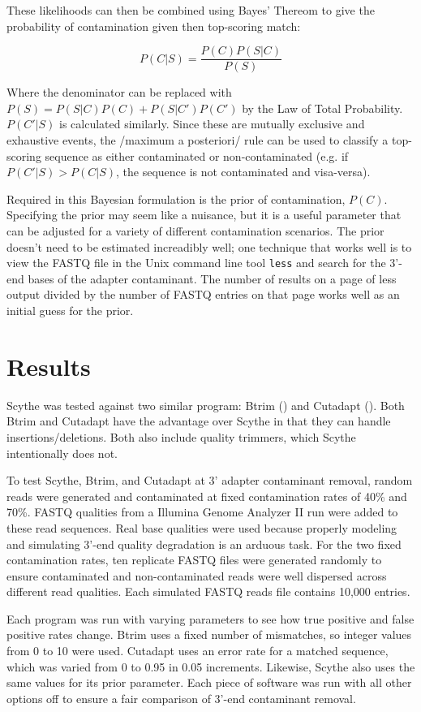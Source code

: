 \documentclass{bioinfo}
\begin{document}
\begin{methods}
These likelihoods can then be combined using Bayes' Thereom to give
the probability of contamination given then top-scoring match:

$$ P(C|S) = \frac{P(C) P(S|C)}{P(S)} $$

Where the denominator can be replaced with $P(S) = P(S | C)P(C) +
P(S | C') P(C')$ by the Law of Total Probability. $P(C'|S)$ is
calculated similarly. Since these are mutually exclusive and
exhaustive events, the /maximum a posteriori/ rule can be used to
classify a top-scoring sequence as either contaminated or
non-contaminated (e.g. if $P(C'|S) > P(C|S)$, the sequence is not
contaminated and visa-versa).

Required in this Bayesian formulation is the prior of contamination,
$P(C)$. Specifying the prior may seem like a nuisance, but it is a
useful parameter that can be adjusted for a variety of different
contamination scenarios. The prior doesn't need to be estimated
increadibly well; one technique that works well is to view the FASTQ
file in the Unix command line tool \texttt{less} and search for the
3'-end bases of the adapter contaminant. The number of results on a
page of less output divided by the number of FASTQ entries on that
page works well as an initial guess for the prior.


\section{Results}
Scythe was tested against two similar program: Btrim
(\citealp{pmid21651976}) and Cutadapt (\citealp{pmid19737799}). Both
Btrim and Cutadapt have the advantage over Scythe in that they can
handle insertions/deletions. Both also include quality trimmers, which
Scythe intentionally does not.

To test Scythe, Btrim, and Cutadapt at 3' adapter contaminant removal,
random reads were generated and contaminated at fixed contamination
rates of 40\% and 70\%. FASTQ qualities from a Illumina Genome
Analyzer II run were added to these read sequences. Real base
qualities were used because properly modeling and simulating 3'-end
quality degradation is an arduous task. For the two fixed
contamination rates, ten replicate FASTQ files were generated randomly
to ensure contaminated and non-contaminated reads were well dispersed
across different read qualities. Each simulated FASTQ reads file
contains 10,000 entries.

Each program was run with varying parameters to see how true positive
and false positive rates change. Btrim uses a fixed number of
mismatches, so integer values from 0 to 10 were used. Cutadapt uses an
error rate for a matched sequence, which was varied from 0 to 0.95 in
0.05 increments. Likewise, Scythe also uses the same values for its
prior parameter. Each piece of software was run with all other options
off to ensure a fair comparison of 3'-end contaminant removal.


\end{methods}
\end{document}
